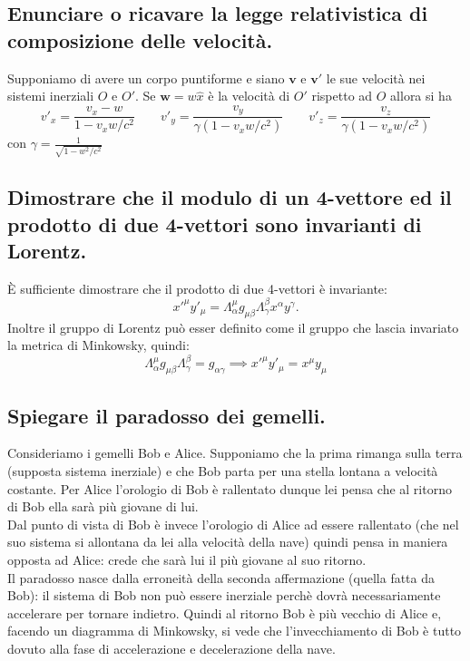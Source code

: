 \subsection[]{ Enunciare o ricavare la legge relativistica di composizione delle velocità.}
Supponiamo di avere un corpo puntiforme e siano $\boldsymbol{v}$ e $\boldsymbol{v'}$ le sue velocità nei sistemi inerziali $O$ e  $O'$.
Se  $\boldsymbol{w} = w \hat{x}$ è la velocità di $O'$ rispetto ad $O$ allora si ha 
\[
	v'_{x} = \frac{v_{x} - w}{1 - v_{x}w/c^{2}} \quad \quad
	v'_{y} = \frac{v_{y}}{\gamma \left( 1 - v_{x}w/c^{2} \right) } \quad \quad
	v'_{z} = \frac{v_{z}}{\gamma \left( 1 - v_{x}w/c^{2} \right) }
\]
con $\gamma = \frac{1}{\sqrt{1 - w^{2}/c^{2}}}$

\subsection[]{ Dimostrare che il modulo di un 4-vettore ed il prodotto di due 4-vettori sono invarianti di Lorentz.} 
È sufficiente dimostrare che il prodotto di due 4-vettori è invariante:
\[
	x'^{\mu} y'_{\mu} = \Lambda^{\mu}_{\alpha} g_{\mu \beta} \Lambda^{\beta}_{\gamma} x^{\alpha} y^{\gamma}
.\]
Inoltre il gruppo di Lorentz può esser definito come il gruppo che lascia invariato la metrica di Minkowsky, quindi:
\[
	\Lambda^{\mu}_{\alpha} g_{\mu \beta} \Lambda^{\beta}_{\gamma} = g_{\alpha \gamma} \implies x'^{\mu}y'_{\mu} = x^{\mu}y_{\mu}
\]  
\subsection[]{ Spiegare il paradosso dei gemelli.} 
Consideriamo i gemelli Bob e Alice. Supponiamo che la prima rimanga sulla terra (supposta sistema inerziale) e che Bob parta per una stella lontana a velocità costante. Per Alice l'orologio di Bob è rallentato dunque lei pensa che al ritorno di Bob ella sarà più giovane di lui.\\ 
Dal punto di vista di Bob è invece l'orologio di Alice ad essere rallentato (che nel suo sistema si allontana da lei alla velocità della nave) quindi pensa in maniera opposta ad Alice: crede che sarà lui il più giovane al suo ritorno.\\
Il paradosso nasce dalla erroneità della seconda affermazione (quella fatta da Bob): il sistema di Bob non può essere inerziale perchè dovrà necessariamente accelerare per tornare indietro. Quindi al ritorno Bob è più vecchio di Alice e, facendo un diagramma di Minkowsky, si vede che l'invecchiamento di Bob è tutto dovuto alla fase di accelerazione e decelerazione della nave.
